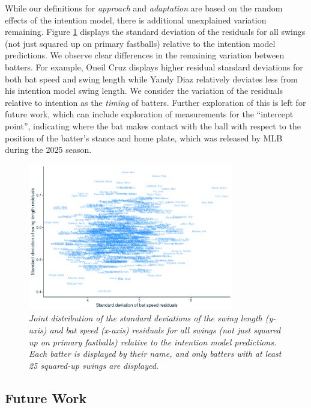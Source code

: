 \documentclass{article}
\begin{document}
      While our definitions for \textit{approach} and \textit{adaptation} are based on the random effects of the intention model, there is additional unexplained variation remaining. Figure \ref{fig:resid-sd} displays the standard deviation of the residuals for all swings (not just squared up on primary fastballs) relative to the intention model predictions. We observe clear differences in the remaining variation between batters. For example, Oneil Cruz displays higher residual standard deviations for both bat speed and swing length while Yandy Diaz relatively deviates less from his intention model swing length. We consider the variation of the residuals relative to intention as the \textit{timing} of batters. Further exploration of this is left for future work, which can include exploration of measurements  for the ``intercept point'', indicating where the bat makes contact with the ball with respect to the position of the batter's stance and home plate, which was released by MLB during the 2025 season.
      
      \begin{figure}[H]
        \centering
        \includegraphics[width = 0.8\textwidth]{../../figures/residual_sd.pdf}
        \caption{\it Joint distribution of the standard deviations of the swing length (y-axis) and bat speed (x-axis) residuals for all swings (not just squared up on primary fastballs) relative to the intention model predictions. Each batter is displayed by their name, and only batters with at least 25 squared-up swings are displayed.}
        \label{fig:resid-sd}
      \end{figure}


    \subsection{Future Work}
    \label{sec:future-work}
\end{document}
